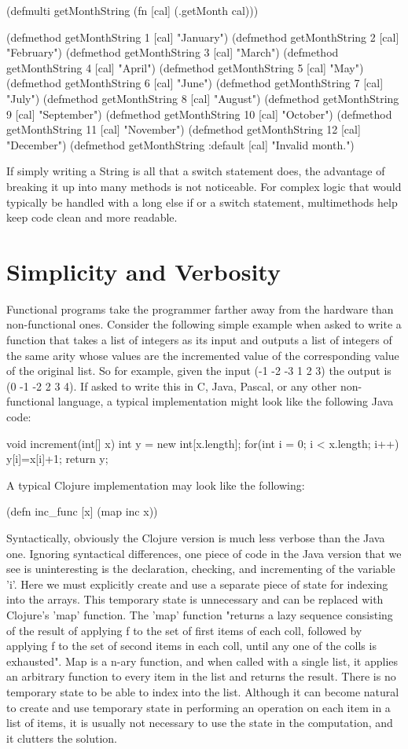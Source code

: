(defmulti getMonthString (fn [cal] (.getMonth cal)))

(defmethod getMonthString 1 [cal] "January")
(defmethod getMonthString 2 [cal] "February")
(defmethod getMonthString 3 [cal] "March")
(defmethod getMonthString 4 [cal] "April")
(defmethod getMonthString 5 [cal] "May")
(defmethod getMonthString 6 [cal] "June")
(defmethod getMonthString 7 [cal] "July")
(defmethod getMonthString 8 [cal] "August")
(defmethod getMonthString 9 [cal] "September")
(defmethod getMonthString 10 [cal] "October")
(defmethod getMonthString 11 [cal] "November")
(defmethod getMonthString 12 [cal] "December")
(defmethod getMonthString :default [cal] "Invalid month.")

If simply writing a String is all that a switch statement does, the advantage of breaking it up into many
methods is not noticeable. For complex logic that would typically be handled with a long else if or a switch statement, 
multimethods help keep code clean and more readable.

\section{Simplicity and Verbosity}
Functional programs take the programmer farther away from the hardware than non-functional ones. Consider the following simple example when asked to write a function that takes a list of integers as its input and outputs a list of integers of the same arity whose values are the incremented value of the corresponding value of the original list. So for example, given the input (-1 -2 -3 1 2 3) the output is (0 -1 -2 2 3 4). If asked to write this in C, Java, Pascal, or any other non-functional language, a typical implementation might look like the following Java code: 

void increment(int[] x) {
	int y = new int[x.length];
	for(int i = 0; i < x.length; i++) { 
	  y[i]=x[i]+1;
         }
         return y;
}

A typical Clojure implementation may look like the following: 

(defn inc_func [x] (map inc x))

Syntactically, obviously the Clojure version is much less verbose than the Java one.
Ignoring syntactical differences, one piece of code in the Java version that we see is uninteresting is the declaration,
checking, and incrementing of the variable 'i'. Here we must explicitly create and use a separate piece of state for indexing into the arrays. This temporary state is unnecessary
and can be replaced with Clojure's 'map' function. The 'map' function "returns a lazy sequence consisting of the result of applying f to the
set of first items of each coll, followed by applying f to the set
of second items in each coll, until any one of the colls is
exhausted". Map is a n-ary function, and when called with a single list, it applies an arbitrary function to every item in the list and returns the result. There is no 
temporary state to be able to index into the list. Although it can become natural to create and use temporary state in performing an operation on each item in a list of items,
it is usually not necessary to use the state in the computation, and it clutters the solution. 

